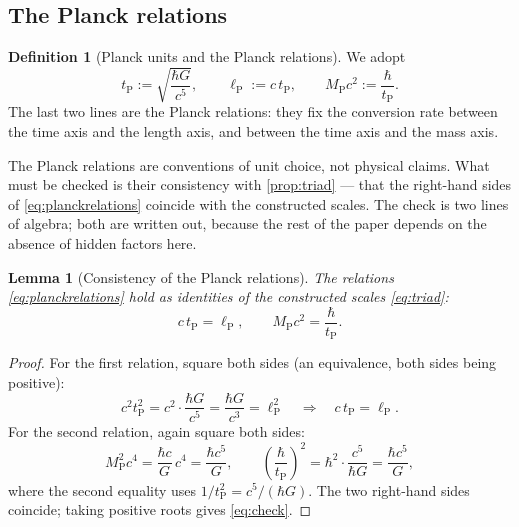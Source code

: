 \documentclass[11pt]{amsbook}
\theoremstyle{plain}
\newtheorem{lemma}[theorem]{Lemma}
\theoremstyle{definition}
\newtheorem{definition}[theorem]{Definition}
\theoremstyle{remark}
\newcommand{\uses}[1]{\par\nopagebreak\noindent{\footnotesize\emph{Uses: #1.}\par}}
\begin{document}
\subsection{The Planck relations}

\begin{definition}[Planck units and the Planck relations]\label{def:units}
We adopt
\begin{equation}\label{eq:planckrelations}
t_{\mathrm P} := \sqrt{\frac{\hbar G}{c^{5}}},\qquad
\ell_{\mathrm P} := c\, t_{\mathrm P},\qquad
M_{\mathrm P} c^{2} := \frac{\hbar}{t_{\mathrm P}}.
\end{equation}
The last two lines are the Planck relations: they fix the conversion rate between the time axis and the length axis, and between the time axis and the mass axis.
\end{definition}

The Planck relations are conventions of unit choice, not physical claims. What must be checked is their consistency with \cref{prop:triad} --- that the right-hand sides of \cref{eq:planckrelations} coincide with the constructed scales. The check is two lines of algebra; both are written out, because the rest of the paper depends on the absence of hidden factors here.

\begin{lemma}[Consistency of the Planck relations]\label{lem:relations}
The relations \cref{eq:planckrelations} hold as identities of the constructed scales \cref{eq:triad}:
\begin{equation}\label{eq:check}
c\, t_{\mathrm P} = \ell_{\mathrm P},
\qquad
M_{\mathrm P} c^{2} = \frac{\hbar}{t_{\mathrm P}}.
\end{equation}
\uses{\cref{def:units}, \cref{prop:triad}}
\end{lemma}

\begin{proof}
For the first relation, square both sides (an equivalence, both sides being positive):
\begin{equation}\label{eq:check1}
c^{2} t_{\mathrm P}^{2} = c^{2}\cdot\frac{\hbar G}{c^{5}} = \frac{\hbar G}{c^{3}} = \ell_{\mathrm P}^{2}
\quad\Longrightarrow\quad
c\, t_{\mathrm P} = \ell_{\mathrm P}.
\end{equation}
For the second relation, again square both sides:
\begin{equation}\label{eq:check2}
M_{\mathrm P}^{2} c^{4} = \frac{\hbar c}{G}\, c^{4} = \frac{\hbar c^{5}}{G},
\qquad
\left(\frac{\hbar}{t_{\mathrm P}}\right)^{2} = \hbar^{2}\cdot\frac{c^{5}}{\hbar G} = \frac{\hbar c^{5}}{G},
\end{equation}
where the second equality uses $1/t_{\mathrm P}^{2} = c^{5}/(\hbar G)$. The two right-hand sides coincide; taking positive roots gives \cref{eq:check}.
\end{proof}
\end{document}
